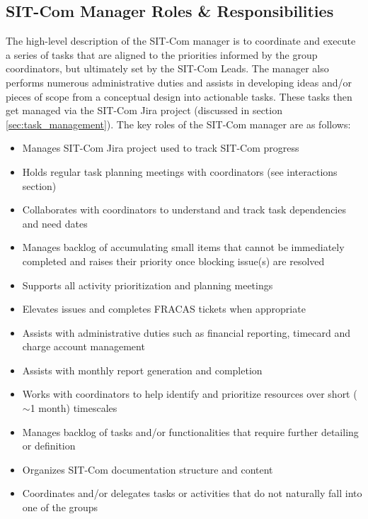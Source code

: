 \documentclass[SE,lsstdraft,authoryear,toc]{lsstdoc, lsstdraft}
\begin{document}
\subsection{SIT-Com Manager Roles \& Responsibilities}
\label{sec:manager_r_and_rs}
The high-level description of the SIT-Com manager is to coordinate and execute a series of tasks that are aligned to the priorities informed by the group coordinators, but ultimately set by the SIT-Com Leads.
The manager also performs numerous administrative duties and assists in developing ideas and/or pieces of scope from a conceptual design into actionable tasks.
These tasks then get managed via the SIT-Com Jira project (discussed in section \ref{sec:task_management}). The key roles of the SIT-Com manager are as follows:
\begin{itemize}
    \item Manages SIT-Com Jira project used to track SIT-Com progress
    \item Holds regular task planning meetings with coordinators (see interactions section)
    \item Collaborates with coordinators to understand and track task dependencies and need dates
    \item Manages backlog of accumulating small items that cannot be immediately completed and raises their priority once blocking issue(s) are resolved
    \item Supports all activity prioritization and planning meetings
    \item Elevates issues and completes FRACAS tickets when appropriate
    \item Assists with administrative duties such as financial reporting, timecard and charge account management
    \item Assists with monthly report generation and completion
    \item Works with coordinators to help identify and prioritize resources over short ($\sim$1 month) timescales
    \item Manages backlog of tasks and/or functionalities that require further detailing or definition
    \item Organizes SIT-Com documentation structure and content
    \item Coordinates and/or delegates tasks or activities that do not naturally fall into one of the groups
\end{itemize}
\end{document}
